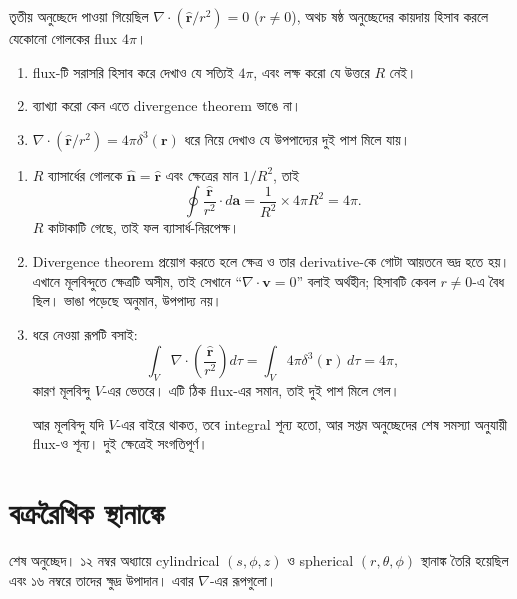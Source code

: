 \documentclass[11pt]{article}
\begin{document}
 তৃতীয় অনুচ্ছেদে পাওয়া গিয়েছিল $\nabla\cdot\left(
\hat{\mathbf{r}}/r^{2} \right) = 0$ ($r\neq 0$), অথচ ষষ্ঠ অনুচ্ছেদের কায়দায়
হিসাব করলে যেকোনো গোলকের flux $4\pi$।
\begin{enumerate}
  \item flux-টি সরাসরি হিসাব করে দেখাও যে সত্যিই $4\pi$, এবং লক্ষ করো যে
        উত্তরে $R$ নেই।
  \item ব্যাখ্যা করো কেন এতে divergence theorem ভাঙে না।
  \item $\nabla\cdot\left( \hat{\mathbf{r}}/r^{2} \right)
        = 4\pi\delta^{3}(\mathbf{r})$ ধরে নিয়ে দেখাও যে উপপাদ্যের দুই পাশ
        মিলে যায়।
\end{enumerate}

\begin{sol}
\begin{enumerate}
  \item $R$ ব্যাসার্ধের গোলকে $\hat{\mathbf{n}} = \hat{\mathbf{r}}$ এবং
        ক্ষেত্রের মান $1/R^{2}$, তাই
        \[
          \oint\frac{\hat{\mathbf{r}}}{r^{2}}\cdot d\mathbf{a}
          = \frac{1}{R^{2}} \times 4\pi R^{2} = 4\pi .
        \]
        $R$ কাটাকাটি গেছে, তাই ফল ব্যাসার্ধ-নিরপেক্ষ।
  \item Divergence theorem প্রয়োগ করতে হলে ক্ষেত্র ও তার derivative-কে
        গোটা আয়তনে ভদ্র হতে হয়। এখানে মূলবিন্দুতে ক্ষেত্রটি অসীম, তাই
        সেখানে ``$\nabla\cdot\mathbf{v} = 0$'' বলাই অর্থহীন; হিসাবটি কেবল
        $r\neq 0$-এ বৈধ ছিল। ভাঙা পড়েছে অনুমান, উপপাদ্য নয়।
  \item ধরে নেওয়া রূপটি বসাই:
        \[
          \int_{V}\nabla\cdot\left( \frac{\hat{\mathbf{r}}}{r^{2}} \right)
          d\tau = \int_{V}4\pi\delta^{3}(\mathbf{r})\,d\tau = 4\pi ,
        \]
        কারণ মূলবিন্দু $V$-এর ভেতরে। এটি ঠিক flux-এর সমান, তাই দুই পাশ
        মিলে গেল।

        আর মূলবিন্দু যদি $V$-এর বাইরে থাকত, তবে integral শূন্য হতো, আর
        সপ্তম অনুচ্ছেদের শেষ সমস্যা অনুযায়ী flux-ও শূন্য। দুই ক্ষেত্রেই
        সংগতিপূর্ণ।
\end{enumerate}
\end{sol}

\section{বক্ররৈখিক স্থানাঙ্কে}

শেষ অনুচ্ছেদ। ১২ নম্বর অধ্যায়ে cylindrical $(s,\phi,z)$ ও spherical
$(r,\theta,\phi)$ স্থানাঙ্ক তৈরি হয়েছিল এবং ১৬ নম্বরে তাদের ক্ষুদ্র উপাদান।
এবার $\nabla$-এর রূপগুলো।
\end{document}
